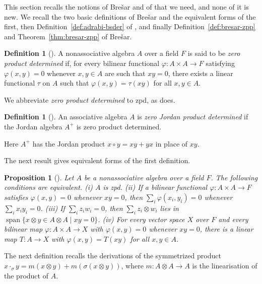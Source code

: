 \documentclass[]{interact}
\theoremstyle{plain}
\newtheorem{proposition}[theorem]{Proposition}
\theoremstyle{definition}
\newtheorem{definition}[theorem]{Definition}
\theoremstyle{remark}
\begin{document}
This section recalls the notions of Bre\v{s}ar and of \citet{Adrabi2026} that we need, and none of it is new.
We recall the two basic definitions of Bre\v{s}ar and the equivalent forms of the first, then Definition~\ref{def:adrabi-bsder} of \citet{Adrabi2026}, and finally Definition~\ref{def:bresar-zpp} and Theorem~\ref{thm:bresar-zpp} of Bre\v{s}ar.

\begin{definition}[{\citep[Definition 1.1]{Bresar2021}}]\label{def:bresar-zpd}
A nonassociative algebra $A$ over a field $F$ is said to be \emph{zero product determined} if, for every bilinear functional $\varphi \colon A \times A \to F$ satisfying $\varphi(x,y) = 0$ whenever $x, y \in A$ are such that $xy = 0$, there exists a linear functional $\tau$ on $A$ such that $\varphi(x,y) = \tau(xy)$ for all $x, y \in A$.
\end{definition}

We abbreviate \emph{zero product determined} to zpd, as \citet[\S1.1]{Bresar2021} does.

\begin{definition}[{\citep[Definition 3.14]{Bresar2021}}]\label{def:bresar-zjpd}
An associative algebra $A$ is \emph{zero Jordan product determined} if the Jordan algebra $A^+$ is zero product determined.
\end{definition}

Here $A^+$ has the Jordan product $x \circ y = xy + yx$ in place of $xy$. %

The next result gives equivalent forms of the first definition.

\begin{proposition}[{\citep[Proposition 1.3]{Bresar2021}}]\label{prop:bresar-zpd}
Let $A$ be a nonassociative algebra over a field $F$.
The following conditions are equivalent.
(i) $A$ is zpd.
(ii) If a bilinear functional $\varphi \colon A \times A \to F$ satisfies $\varphi(x,y) = 0$ whenever $xy = 0$, then $\sum_i \varphi(x_i, y_i) = 0$ whenever $\sum_i x_i y_i = 0$.
(iii) If $\sum_i z_i w_i = 0$, then $\sum_i z_i \otimes w_i$ lies in $\operatorname{span}\{x \otimes y \in A \otimes A \mid xy = 0\}$.
(iv) For every vector space $X$ over $F$ and every bilinear map $\varphi \colon A \times A \to X$ with $\varphi(x,y) = 0$ whenever $xy = 0$, there is a linear map $T \colon A \to X$ with $\varphi(x,y) = T(xy)$ for all $x, y \in A$.
\end{proposition}

The next definition recalls the derivations of the symmetrized product $x \cdot_\sigma y = m(x \otimes y) + m(\sigma(x \otimes y))$, where $m \colon A \otimes A \to A$ is the linearisation of the product of $A$. %
\end{document}
